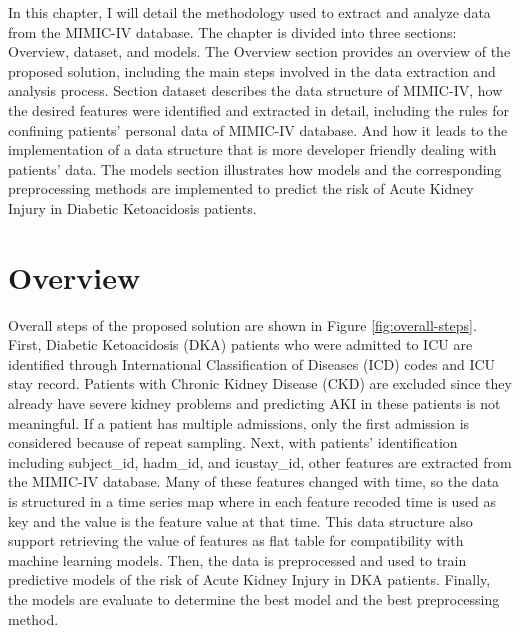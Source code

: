 \documentclass[../main.tex]{subfiles}
\begin{document}
In this chapter, I will detail the methodology used to extract and analyze data from the MIMIC-IV database.
The chapter is divided into three sections: Overview, dataset, and models.
The Overview section provides an overview of the proposed solution, including the main steps involved in the data extraction and analysis process.
Section dataset describes the data structure of MIMIC-IV, how the desired features were identified and  extracted in detail, including the rules for confining patients' personal data of MIMIC-IV database.
And how it leads to the implementation of a data structure that is more developer friendly dealing with patients' data.
The models section illustrates how models and the corresponding preprocessing methods are implemented to predict the risk of Acute Kidney Injury in Diabetic Ketoacidosis patients.


\section{Overview}

Overall steps of the proposed solution are shown in Figure \ref{fig:overall-steps}.
First, Diabetic Ketoacidosis (DKA) patients who were admitted to ICU are identified through International Classification of Diseases (ICD) codes and ICU stay record.
Patients with Chronic Kidney Disease (CKD) are excluded since they already have severe kidney problems and predicting AKI in these patients is not meaningful.
If a patient has multiple admissions, only the first admission is considered because of repeat sampling.
Next, with patients' identification including subject\_id, hadm\_id, and icustay\_id, other features are extracted from the MIMIC-IV database.
Many of these features changed with time, so the data is structured in a time series map where in each feature recoded time is used as key and the value is the feature value at that time.
This data structure also support retrieving the value of features as flat table for compatibility with machine learning models.
Then, the data is preprocessed and used to train predictive models of the risk of Acute Kidney Injury in DKA patients.
Finally, the models are evaluate to determine the best model and the best preprocessing method.
\end{document}
